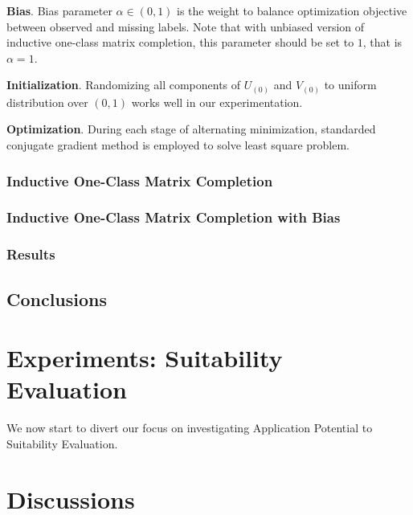 \documentclass{article} %
\begin{document}
\textbf{Bias}. Bias parameter $\alpha \in (0, 1)$ is the weight to balance
optimization objective between observed and missing labels. Note that with
unbiased version of inductive one-class matrix completion, this parameter
should be set to $1$, that is $\alpha = 1$.

\textbf{Initialization}. Randomizing all components of $U_{(0)}$ and
$V_{(0)}$ to uniform distribution over $(0, 1)$ works well in our
experimentation. 

\textbf{Optimization}.
During each stage of alternating minimization, standarded conjugate gradient method is
employed to solve least square problem. 

\subsubsection{Inductive One-Class Matrix Completion} %

\subsubsection{Inductive One-Class Matrix Completion with Bias} 

\subsubsection{Results}


\subsection{Conclusions}


\section{Experiments: Suitability Evaluation}
We now start to divert our focus on investigating Application Potential to
Suitability Evaluation.

\section{Discussions}

{}

\end{document}
